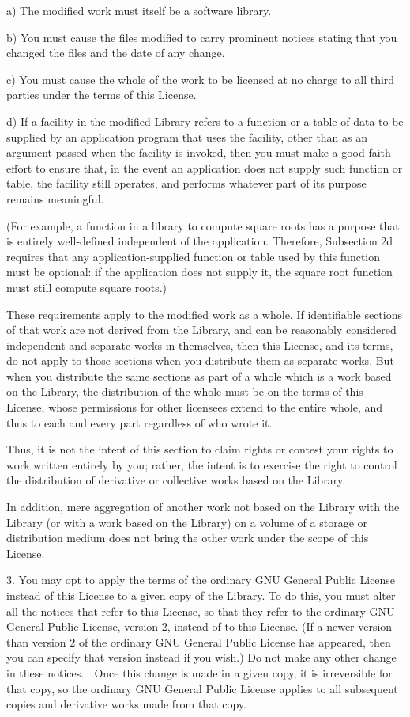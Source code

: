 \documentclass[a4paper,twoside,12pt]{book}
\begin{document}
    a) The modified work must itself be a software library.

    b) You must cause the files modified to carry prominent notices
    stating that you changed the files and the date of any change.

    c) You must cause the whole of the work to be licensed at no
    charge to all third parties under the terms of this License.

    d) If a facility in the modified Library refers to a function or a
    table of data to be supplied by an application program that uses
    the facility, other than as an argument passed when the facility
    is invoked, then you must make a good faith effort to ensure that,
    in the event an application does not supply such function or
    table, the facility still operates, and performs whatever part of
    its purpose remains meaningful.

    (For example, a function in a library to compute square roots has
    a purpose that is entirely well-defined independent of the
    application.  Therefore, Subsection 2d requires that any
    application-supplied function or table used by this function must
    be optional: if the application does not supply it, the square
    root function must still compute square roots.)

These requirements apply to the modified work as a whole.  If
identifiable sections of that work are not derived from the Library,
and can be reasonably considered independent and separate works in
themselves, then this License, and its terms, do not apply to those
sections when you distribute them as separate works.  But when you
distribute the same sections as part of a whole which is a work based
on the Library, the distribution of the whole must be on the terms of
this License, whose permissions for other licensees extend to the
entire whole, and thus to each and every part regardless of who wrote
it.

Thus, it is not the intent of this section to claim rights or contest
your rights to work written entirely by you; rather, the intent is to
exercise the right to control the distribution of derivative or
collective works based on the Library.

In addition, mere aggregation of another work not based on the Library
with the Library (or with a work based on the Library) on a volume of
a storage or distribution medium does not bring the other work under
the scope of this License.

  3. You may opt to apply the terms of the ordinary GNU General Public
License instead of this License to a given copy of the Library.  To do
this, you must alter all the notices that refer to this License, so
that they refer to the ordinary GNU General Public License, version 2,
instead of to this License.  (If a newer version than version 2 of the
ordinary GNU General Public License has appeared, then you can specify
that version instead if you wish.)  Do not make any other change in
these notices.

  Once this change is made in a given copy, it is irreversible for
that copy, so the ordinary GNU General Public License applies to all
subsequent copies and derivative works made from that copy.
\end{document}
